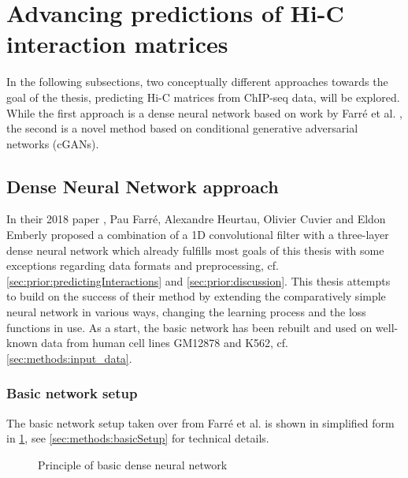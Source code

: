 \section{Advancing predictions of Hi-C interaction matrices}
In the following subsections, two conceptually different approaches towards the goal of the thesis,
predicting Hi-C matrices from ChIP-seq data, will be explored.
While the first approach is a dense neural network based on work by Farr\'e et al. \cite{Farre2018a},
the second is a novel method based on conditional generative adversarial networks (cGANs).

\subsection{Dense Neural Network approach}\label{sec:improve:DNNapproach}
In their 2018 paper \cite{Farre2018a}, Pau Farr\'e, Alexandre Heurtau, Olivier Cuvier and Eldon Emberly
proposed a combination of a 1D convolutional filter with a three-layer dense neural network 
which already fulfills most goals of this thesis with some exceptions regarding data formats and preprocessing, 
cf. \cref{sec:prior:predictingInteractions} and \ref{sec:prior:discussion}.
This thesis attempts to build on the success of their method by extending the comparatively simple neural network
in various ways, changing the learning process and the loss functions in use.
As a start, the basic network has been rebuilt and used on well-known data from human cell lines GM12878 and K562, cf. \cref{sec:methods:input_data}.

\subsubsection{Basic network setup} \label{sec:improve:basicNetwork}
The basic network setup taken over from Farr\'e et al. \cite{Farre2018a} is shown in simplified form in \cref{fig:improve:priciple_basic_dnn},
see \cref{sec:methods:basicSetup} for technical details.
\begin{figure}[hbp]
    \small
    \centering
    \caption{Principle of basic dense neural network}
    \label{fig:improve:priciple_basic_dnn}
\end{figure}

